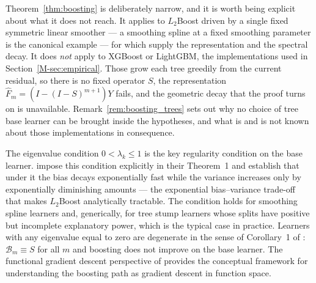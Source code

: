 \documentclass[12pt,a4paper]{article}
\numberwithin{equation}{section}
\theoremstyle{plain}
\theoremstyle{definition}
\begin{document}
	Theorem~\ref{thm:boosting} is deliberately narrow, and it is worth being
	explicit about what it does not reach. It applies to $L_2$Boost driven by a
	single fixed symmetric linear smoother --- a smoothing spline at a fixed
	smoothing parameter is the canonical example --- for which
	\citet{buhlmann2003boosting} supply the representation and the spectral
	decay. It does \emph{not} apply to XGBoost or LightGBM, the implementations
	used in Section~\ref{M-sec:empirical}. Those grow each tree greedily from the
	current residual, so there is no fixed operator $S$, the representation
	$\hat{F}_m = (I - (I-S)^{m+1})Y$ fails, and the geometric decay that the
	proof turns on is unavailable. Remark~\ref{rem:boosting_trees} sets out why
	no choice of tree base learner can be brought inside the hypotheses, and what
	is and is not known about those implementations in consequence.
	
	The eigenvalue condition $0 < \lambda_k \leq 1$ is the key regularity condition on
	the base learner. \citet{buhlmann2003boosting} impose this condition explicitly in
	their Theorem~1 and establish that under it the bias decays exponentially fast while
	the variance increases only by exponentially diminishing amounts --- the exponential
	bias--variance trade-off that makes $L_2$Boost analytically tractable. The condition
	holds for smoothing spline learners and, generically, for tree stump learners whose
	splits have positive but incomplete explanatory power, which is the typical case in
	practice. Learners with any eigenvalue equal to zero are degenerate in the sense of
	Corollary~1 of \citet{buhlmann2003boosting}: $\mathcal{B}_m \equiv S$ for all $m$ and
	boosting does not improve on the base learner. The functional gradient descent
	perspective of \citet{mason2000boosting} provides the conceptual framework for
	understanding the boosting path as gradient descent in function space.
	
\end{document}
